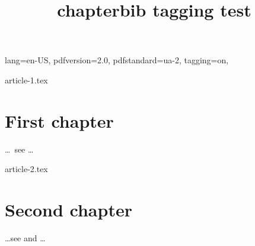 \RequirePackage{luatagging}
\DocumentMetadata
  {
    lang=en-US,
    pdfversion=2.0,
    pdfstandard=ua-2,
    tagging=on,
  }
\begin{filecontents}[force]{article-1.tex}
\chapter{First chapter}
\ldots\ see \cite{inbook-full} \ldots


\end{filecontents}
\begin{filecontents}[force]{article-2.tex}
\chapter{Second chapter}
\ldots see \cite{inbook-full}
and \cite{article-full} \ldots


\end{filecontents}
\documentclass{report}

\usepackage[
  gather %
  ]{chapterbib} 

\title{chapterbib tagging test}





